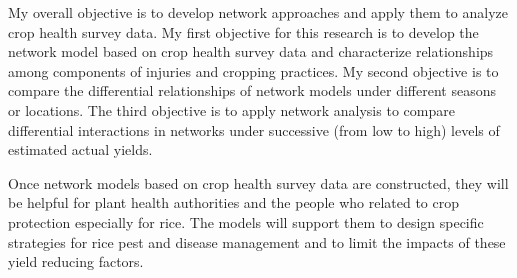 My overall objective is to develop network approaches and apply them to analyze crop health survey data. My first objective for this research is to develop the network model based on crop health survey data and characterize relationships among components of injuries and cropping practices. My second objective is to compare the differential relationships of network models under different seasons or locations. The third objective is to apply network analysis to compare differential interactions in networks under successive (from low to high) levels of estimated actual yields.


Once network models based on crop health survey data are constructed, they will be helpful for plant health authorities and the people who related to crop protection especially for rice. The models will support them to design specific strategies for rice pest and disease management and to limit the impacts of these yield reducing factors.  


